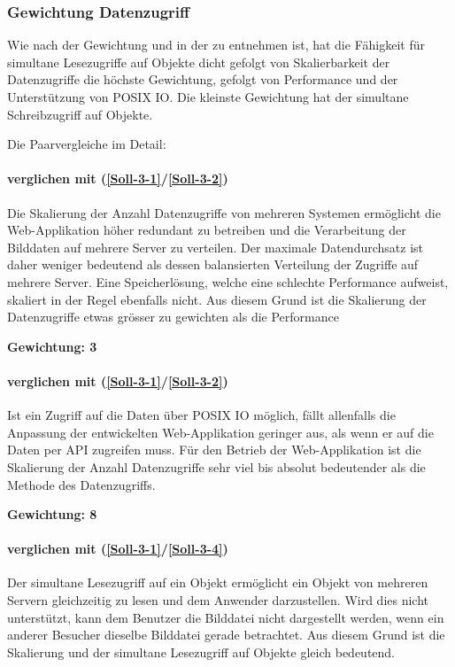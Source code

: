 \subsubsection*{Gewichtung Datenzugriff}

Wie nach der Gewichtung und in der  zu entnehmen ist, hat die Fähigkeit für simultane Lesezugriffe auf Objekte dicht gefolgt von Skalierbarkeit der Datenzugriffe die höchste Gewichtung, gefolgt von Performance und der Unterstützung von POSIX IO. Die kleinste Gewichtung hat der simultane Schreibzugriff auf Objekte.


Die Paarvergleiche im Detail:

\paragraph*{ verglichen mit  (\ref{Soll-3-1}/\ref{Soll-3-2})}
Die Skalierung der Anzahl Datenzugriffe von mehreren Systemen ermöglicht die Web-Applikation höher redundant zu betreiben und die Verarbeitung der Bilddaten auf mehrere Server zu verteilen. Der maximale Datendurchsatz ist daher weniger bedeutend als dessen balansierten Verteilung der Zugriffe auf mehrere Server. Eine Speicherlösung, welche eine schlechte Performance aufweist, skaliert in der Regel ebenfalls nicht. Aus diesem Grund ist die Skalierung der Datenzugriffe etwas grösser zu gewichten als die Performance 

\textbf{Gewichtung: 3}

\paragraph*{ verglichen mit  (\ref{Soll-3-1}/\ref{Soll-3-2})}
Ist ein Zugriff auf die Daten über POSIX IO möglich, fällt allenfalls die Anpassung der entwickelten Web-Applikation geringer aus, als wenn er auf die Daten per API zugreifen muss. Für den Betrieb der Web-Applikation ist die Skalierung der Anzahl Datenzugriffe sehr viel bis absolut bedeutender als die Methode des Datenzugriffs.

\textbf{Gewichtung: 8}


\paragraph*{ verglichen mit  (\ref{Soll-3-1}/\ref{Soll-3-4})}
Der simultane Lesezugriff auf ein Objekt ermöglicht ein Objekt von mehreren Servern gleichzeitig zu lesen und dem Anwender darzustellen. Wird dies nicht unterstützt, kann dem Benutzer die Bilddatei nicht dargestellt werden, wenn ein anderer Besucher dieselbe Bilddatei gerade betrachtet. Aus diesem Grund ist die Skalierung und der simultane Lesezugriff auf Objekte gleich bedeutend.


